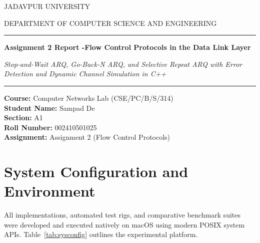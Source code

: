 \documentclass[11pt,a4paper]{article}
\begin{document}
\begin{titlepage}
    \centering
    \vspace*{0.8cm}
    
    {\small JADAVPUR UNIVERSITY \par}
    \vspace{0.6cm}
    {\small DEPARTMENT OF COMPUTER SCIENCE AND ENGINEERING\par}
    \vspace{1.0cm}
    
    \rule{\textwidth}{1.2pt}\par
    \vspace{0.4cm}
    {\huge\bfseries Assignment 2 Report -Flow Control Protocols in the Data Link Layer \par}
    \vspace{0.3cm}
    {\Large\itshape Stop-and-Wait ARQ, Go-Back-N ARQ, and Selective Repeat ARQ with Error Detection and Dynamic Channel Simulation in C++ \par}
    \vspace{0.4cm}
    \rule{\textwidth}{1.2pt}\par
    
    \vspace{1.2cm}
    
    \begin{flushleft} \large
        \textbf{Course:} Computer Networks Lab (CSE/PC/B/S/314) \\
        \textbf{Student Name:} Sampad De \\
        \textbf{Section:} A1 \\
        \textbf{Roll Number:} 002410501025 \\
        \textbf{Assignment:} Assignment 2 (Flow Control Protocols) \\
    \end{flushleft}
    
    \vfill
\end{titlepage}

\newpage


\section*{System Configuration and Environment}
All implementations, automated test rigs, and comparative benchmark suites were developed and executed natively on macOS using modern POSIX system APIs. Table~\ref{tab:sysconfig} outlines the experimental platform.
\end{document}

